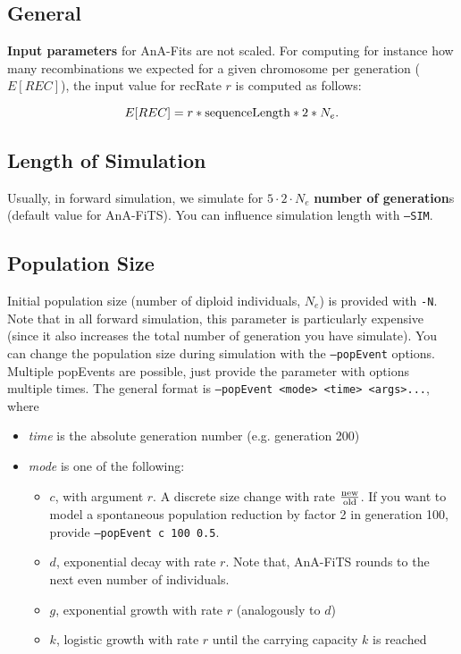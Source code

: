 \documentclass{scrartcl}
\newcommand{\prog}[1]{\texttt{#1}}
\begin{document}
\subsection{General}
\label{sec:general}
\textbf{Input parameters} for AnA-Fits are not scaled.  For computing for
instance how many recombinations we expected for a given chromosome
per generation ($E[REC]$), the input value for recRate $r$ is
computed as follows: 

\begin{equation*}
  \label{eq:1}
  E[REC] = r * \textnormal{sequenceLength} * 2 * N_e. 
\end{equation*}


\subsection{Length of Simulation}
\label{sec:simulation-length}
Usually, in forward simulation, we simulate for $5 \cdot 2 \cdot N_e$
\textbf{number of generation}s (default value for AnA-FiTS). You can
influence simulation length with \prog{--SIM}.

\subsection{Population Size}
\label{sec:population-size}
Initial population size (number of diploid individuals, $N_e$) is
provided with \prog{-N}. Note that in all forward simulation, this
parameter is particularly expensive (since it also increases the total
number of generation you have simulate). You can change the
population size during simulation with the \prog{--popEvent}
options. Multiple popEvents are possible, just provide the parameter
with options multiple times. The general format is \prog{--popEvent
  <mode> <time> <args>...}, where 
\begin{itemize}
\item \textit{time} is the absolute generation number (e.g. generation
  200)
\item \textit{mode} is one of the following: 
  \begin{itemize}
  \item $c$, with argument $r$. A discrete size change with rate
    $\frac{\textnormal{new}}{\textnormal{old}}$. If you want to model
    a spontaneous population reduction by factor 2 in generation 100,
    provide \prog{--popEvent c 100 0.5}.
  \item $d$, exponential decay with rate $r$. Note that, AnA-FiTS
    rounds to the next even number of individuals.
  \item $g$, exponential growth with rate $r$ (analogously to $d$)
  \item $k$, logistic growth with rate $r$ until the carrying capacity
    $k$ is reached 
  \end{itemize}
\end{itemize}
\end{document}
